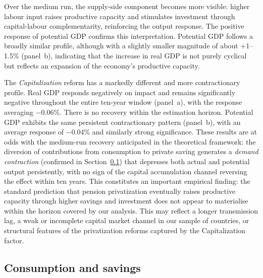 \documentclass[11pt,english,a4paper, twoside, authoryear]{article}
\begin{document}
Over the medium run, the supply-side component becomes more visible: higher labour input raises productive capacity and stimulates investment through capital-labour complementarity, reinforcing the output response. The positive response of potential GDP confirms this interpretation. Potential GDP follows a broadly similar profile, although with a slightly smaller magnitude of about $+$1--1.5\% (panel~b), indicating that the increase in real GDP is not purely cyclical but reflects an expansion of the economy's productive capacity.

The \textit{Capitalization} reform has a markedly different and more contractionary profile. Real GDP responds negatively on impact and remains significantly negative throughout the entire ten-year window (panel~a), with the response averaging $-$0.06\%. There is no recovery within the estimation horizon. Potential GDP exhibits the same persistent contractionary pattern (panel~b), with an average response of $-$0.04\% and similarly strong significance. These results are at odds with the medium-run recovery anticipated in the theoretical framework: the diversion of contributions from consumption to private saving generates a \emph{demand contraction} (confirmed in Section~\ref{sec:conso}) that depresses both actual and potential output persistently, with no sign of the capital accumulation channel reversing the effect within ten years. This constitutes an important empirical finding: the standard prediction that pension privatization eventually raises productive capacity through higher savings and investment does not appear to materialise within the horizon covered by our analysis. This may reflect a longer transmission lag, a weak or incomplete capital market channel in our sample of countries, or structural features of the privatization reforms captured by the Capitalization factor.

\FloatBarrier
\subsection{Consumption and savings}
\label{sec:conso}
\end{document}
